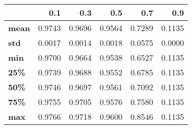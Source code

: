 \begin{tabular}{lrrrrr}
\toprule
{} &     0.1 &     0.3 &     0.5 &     0.7 &     0.9 \\
\midrule
\textbf{mean} &  0.9743 &  0.9696 &  0.9564 &  0.7289 &  0.1135 \\
\textbf{std } &  0.0017 &  0.0014 &  0.0018 &  0.0575 &  0.0000 \\
\textbf{min } &  0.9700 &  0.9664 &  0.9538 &  0.6527 &  0.1135 \\
\textbf{25\% } &  0.9739 &  0.9688 &  0.9552 &  0.6785 &  0.1135 \\
\textbf{50\% } &  0.9746 &  0.9697 &  0.9561 &  0.7092 &  0.1135 \\
\textbf{75\% } &  0.9755 &  0.9705 &  0.9576 &  0.7580 &  0.1135 \\
\textbf{max } &  0.9766 &  0.9718 &  0.9600 &  0.8546 &  0.1135 \\
\bottomrule
\end{tabular}
